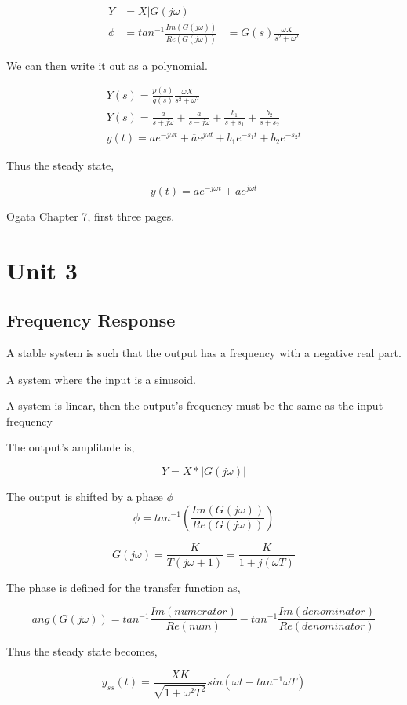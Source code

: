 \documentclass[11pt]{report}
\begin{document}
\begin{align*}
Y &= X|G(j\omega) \\
\phi &= tan^{-1}\frac{Im(G(j\omega))}{Re(G(j\omega))}
&= G(s) \frac{\omega X}{s^2+ \omega^2}
\end{align*}

We can then write it out as a polynomial.

\begin{align*}
Y(s) = \frac{p(s)}{q(s)} \frac{\omega X}{s^2 + \omega^2} \\
Y(s) = \frac{a}{s + j \omega} + \frac{\overline{a}}{s - j \omega} + \frac{b_1}{s+s_1} + \frac{b_2}{s + s_2} \\
y(t) = ae^{-j \omega t} + \overline{a}e^{j \omega t} + b_1 e^{-s_1t} + b_2 e^{-s_2t}
\end{align*}

Thus the steady state,

$$y(t) = ae^{-j \omega t} + \overline{a}e^{j \omega t}$$

Ogata Chapter 7, first three pages.
\chapter{Unit 3}
\label{sec:org492c584}

\section{Frequency Response}
\label{sec:org99cf65c}
A stable system is such that the output has a frequency with a negative real part.

A system where the input is a sinusoid.

A system is linear, then the output's frequency must be the same as the input frequency

The output's amplitude is,

$$Y = X * |G(j \omega) |$$

The output is shifted by a phase \(\phi\)
$$\phi = tan^{-1}(\frac{Im(G(j\omega))}{Re(G(j\omega))})$$

$$G(j\omega) = \frac{K}{T(j\omega + 1)} = \frac{K}{1 + j(\omega T)}$$

The phase is defined for the transfer function as,

$$ang(G(j\omega)) = tan^{-1} \frac{Im(numerator)}{Re(num)} - tan^{-1} \frac{Im(denominator)}{Re(denominator)}$$


Thus the steady state becomes,

$$y_{ss}(t) = \frac{XK}{\sqrt{1 + \omega^2T^2}} sin(\omega t - tan^{-1} \omega T)$$
\end{document}
